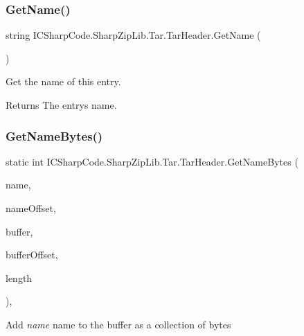 \subsubsection{\texorpdfstring{Get\+Name()}{GetName()}}
{\footnotesize\ttfamily string I\+C\+Sharp\+Code.\+Sharp\+Zip\+Lib.\+Tar.\+Tar\+Header.\+Get\+Name (\begin{DoxyParamCaption}{ }\end{DoxyParamCaption})\hspace{0.3cm}{\ttfamily [inline]}}



Get the name of this entry. 

\begin{DoxyReturn}{Returns}
The entry\textquotesingle{}s name.
\end{DoxyReturn}
\mbox{\label{class_i_c_sharp_code_1_1_sharp_zip_lib_1_1_tar_1_1_tar_header_a54ba5bf152ca9f6fc43706fa71d30ba0}} 
\subsubsection{\texorpdfstring{Get\+Name\+Bytes()}{GetNameBytes()}\hspace{0.1cm}{\footnotesize\ttfamily [1/4]}}
{\footnotesize\ttfamily static int I\+C\+Sharp\+Code.\+Sharp\+Zip\+Lib.\+Tar.\+Tar\+Header.\+Get\+Name\+Bytes (\begin{DoxyParamCaption}\item[{String\+Builder}]{name,  }\item[{int}]{name\+Offset,  }\item[{byte \mbox{[}$\,$\mbox{]}}]{buffer,  }\item[{int}]{buffer\+Offset,  }\item[{int}]{length }\end{DoxyParamCaption})\hspace{0.3cm}{\ttfamily [inline]}, {\ttfamily [static]}}



Add {\itshape name} name to the buffer as a collection of bytes 


